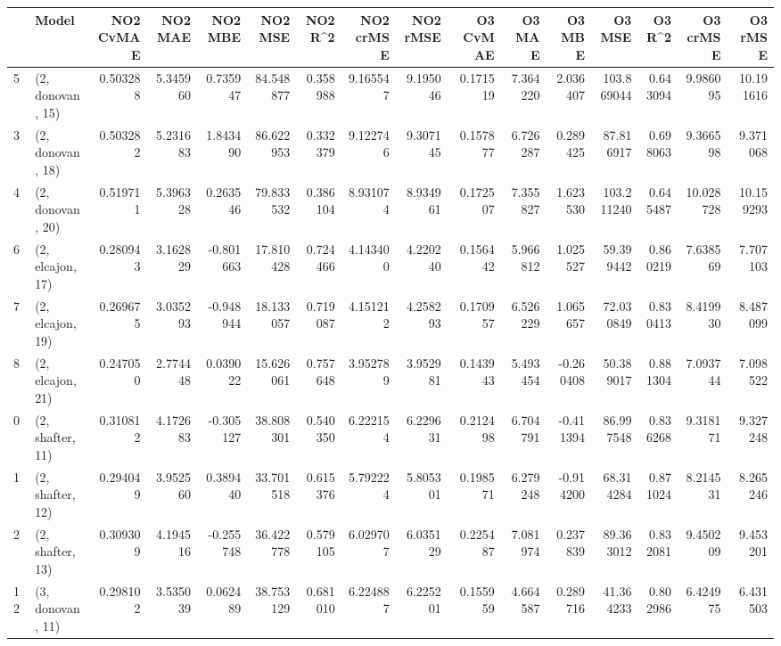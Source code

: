 \begin{tabular}{llrrrrrrrrrrrrrr}
\toprule
{} &             Model &  NO2 CvMAE &   NO2 MAE &   NO2 MBE &    NO2 MSE &   NO2 R\textasciicircum2 &  NO2 crMSE &  NO2 rMSE &  O3 CvMAE &    O3 MAE &    O3 MBE &      O3 MSE &    O3 R\textasciicircum2 &   O3 crMSE &    O3 rMSE \\
\midrule
5  &  (2, donovan, 15) &   0.503288 &  5.345960 &  0.735947 &  84.548877 &  0.358988 &   9.165547 &  9.195046 &  0.171519 &  7.364220 &  2.036407 &  103.869044 &  0.643094 &   9.986095 &  10.191616 \\
3  &  (2, donovan, 18) &   0.503282 &  5.231683 &  1.843490 &  86.622953 &  0.332379 &   9.122746 &  9.307145 &  0.157877 &  6.726287 &  0.289425 &   87.816917 &  0.698063 &   9.366598 &   9.371068 \\
4  &  (2, donovan, 20) &   0.519711 &  5.396328 &  0.263546 &  79.833532 &  0.386104 &   8.931074 &  8.934961 &  0.172507 &  7.355827 &  1.623530 &  103.211240 &  0.645487 &  10.028728 &  10.159293 \\
6  &  (2, elcajon, 17) &   0.280943 &  3.162829 & -0.801663 &  17.810428 &  0.724466 &   4.143400 &  4.220240 &  0.156442 &  5.966812 &  1.025527 &   59.399442 &  0.860219 &   7.638569 &   7.707103 \\
7  &  (2, elcajon, 19) &   0.269675 &  3.035293 & -0.948944 &  18.133057 &  0.719087 &   4.151212 &  4.258293 &  0.170957 &  6.526229 &  1.065657 &   72.030849 &  0.830413 &   8.419930 &   8.487099 \\
8  &  (2, elcajon, 21) &   0.247050 &  2.774448 &  0.039022 &  15.626061 &  0.757648 &   3.952789 &  3.952981 &  0.143943 &  5.493454 & -0.260408 &   50.389017 &  0.881304 &   7.093744 &   7.098522 \\
0  &  (2, shafter, 11) &   0.310812 &  4.172683 & -0.305127 &  38.808301 &  0.540350 &   6.222154 &  6.229631 &  0.212498 &  6.704791 & -0.411394 &   86.997548 &  0.836268 &   9.318171 &   9.327248 \\
1  &  (2, shafter, 12) &   0.294049 &  3.952560 &  0.389440 &  33.701518 &  0.615376 &   5.792224 &  5.805301 &  0.198571 &  6.279248 & -0.914200 &   68.314284 &  0.871024 &   8.214531 &   8.265246 \\
2  &  (2, shafter, 13) &   0.309309 &  4.194516 & -0.255748 &  36.422778 &  0.579105 &   6.029707 &  6.035129 &  0.225487 &  7.081974 &  0.237839 &   89.363012 &  0.832081 &   9.450209 &   9.453201 \\
12 &  (3, donovan, 11) &   0.298102 &  3.535039 &  0.062489 &  38.753129 &  0.681010 &   6.224887 &  6.225201 &  0.155959 &  4.664587 &  0.289716 &   41.364233 &  0.802986 &   6.424975 &   6.431503 \\

\end{tabular}
